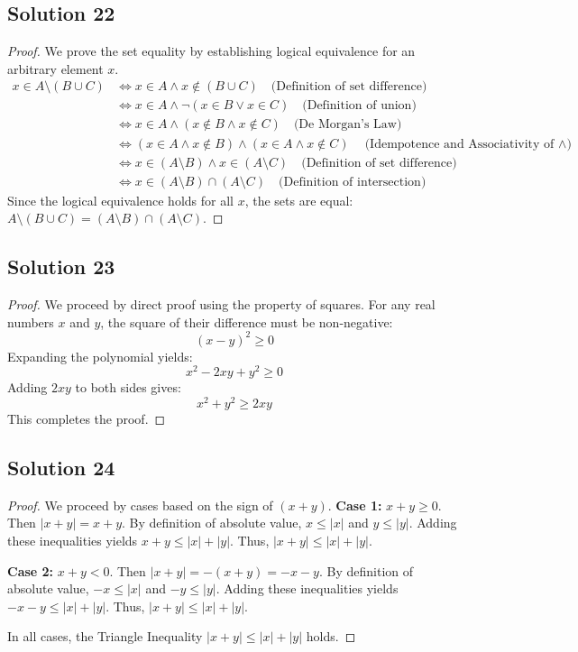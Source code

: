 \documentclass[11pt]{article}
\begin{document}
\subsection{Solution 22}
\begin{proof}
We prove the set equality by establishing logical equivalence for an arbitrary element $x$.
\begin{align*}
x \in A \setminus (B \cup C) &\iff x \in A \land x \notin (B \cup C) \quad \text{(Definition of set difference)} \\
&\iff x \in A \land \neg(x \in B \lor x \in C) \quad \text{(Definition of union)} \\
&\iff x \in A \land (x \notin B \land x \notin C) \quad \text{(De Morgan's Law)} \\
&\iff (x \in A \land x \notin B) \land (x \in A \land x \notin C) \quad \text{(Idempotence and Associativity of $\land$)} \\
&\iff x \in (A \setminus B) \land x \in (A \setminus C) \quad \text{(Definition of set difference)} \\
&\iff x \in (A \setminus B) \cap (A \setminus C) \quad \text{(Definition of intersection)}
\end{align*}
Since the logical equivalence holds for all $x$, the sets are equal: $A \setminus (B \cup C) = (A \setminus B) \cap (A \setminus C)$.
\end{proof}

\subsection{Solution 23}
\begin{proof}
We proceed by direct proof using the property of squares. For any real numbers $x$ and $y$, the square of their difference must be non-negative:
\[ (x - y)^2 \ge 0 \]
Expanding the polynomial yields:
\[ x^2 - 2xy + y^2 \ge 0 \]
Adding $2xy$ to both sides gives:
\[ x^2 + y^2 \ge 2xy \]
This completes the proof.
\end{proof}

\subsection{Solution 24}
\begin{proof}
We proceed by cases based on the sign of $(x+y)$.
\textbf{Case 1:} $x+y \ge 0$.
Then $|x+y| = x+y$.
By definition of absolute value, $x \le |x|$ and $y \le |y|$.
Adding these inequalities yields $x+y \le |x| + |y|$.
Thus, $|x+y| \le |x| + |y|$.

\textbf{Case 2:} $x+y < 0$.
Then $|x+y| = -(x+y) = -x - y$.
By definition of absolute value, $-x \le |x|$ and $-y \le |y|$.
Adding these inequalities yields $-x - y \le |x| + |y|$.
Thus, $|x+y| \le |x| + |y|$.

In all cases, the Triangle Inequality $|x+y| \le |x| + |y|$ holds.
\end{proof}
\end{document}
